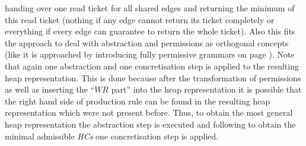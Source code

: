 	handing over one read ticket for all shared edges and returning the minimum
	of this read ticket (nothing if any edge cannot return its ticket completely
	or everything if every edge can guarantee to return the whole ticket). Also
	this fits the approach to deal with abstraction and permissions as
	orthogonal concepts (like it is approached by introducing fully permissive
	grammars on page \pageref{def:fpg}).
	Note that again one abstraction and one
	concretisation step is applied to the resulting heap representation. This is
	done because after the transformation of permissions as well as inserting
	the \enquote{$\mathit{WR}$ part} into the heap representation it is possible
	that the right hand side of production rule can be found in the resulting
	heap representation which were not present before. Thus, to obtain the
	most general heap representation the abstraction step is executed and
	following to obtain the minimal admissible \emph{\acp{HC}} one
	concretisation step is applied.

